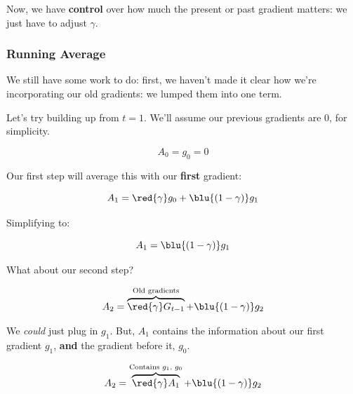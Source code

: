             Now, we have \textbf{control} over how much the present or past gradient matters: we just have to adjust $\gamma$. 
            
        \subsecdiv
        
        \subsubsection{Running Average}
        
            We still have some work to do: first, we haven't made it clear how we're incorporating our old gradients: we lumped them into one term.
            
            Let's try building up from $t=1$. We'll assume our previous gradients are 0, for simplicity.
            
            \begin{equation}
                A_0=g_0=0
            \end{equation}
            
            Our first step will average this with our \textbf{first} gradient:
            
            \begin{equation}
                A_1 
                =  
                \red{\gamma} g_0 + \blu{(1-\gamma)} g_1
            \end{equation}
            
            Simplifying to:
            
            \begin{equation}
                A_1 =  \blu{(1-\gamma)} g_1
            \end{equation}
            
            What about our second step? 
            
            \begin{equation}
                A_2
                =
                \overbrace{
                    \red{\gamma} G_{t-1}
                }^{\text{Old gradients}}
                + 
                \blu{(1-\gamma)} g_2
            \end{equation}
            
            We \textit{could} just plug in $g_1$. But, $A_1$ contains the information about our first gradient $g_1$, \textbf{and} the gradient before it, $g_0$.
            
            \begin{equation}
                A_2
                =
                \overbrace{
                    \red{\gamma} A_1
                }^{\text{Contains $g_1$, $g_0$}}
                + 
                \blu{(1-\gamma)} g_2
            \end{equation}
            
